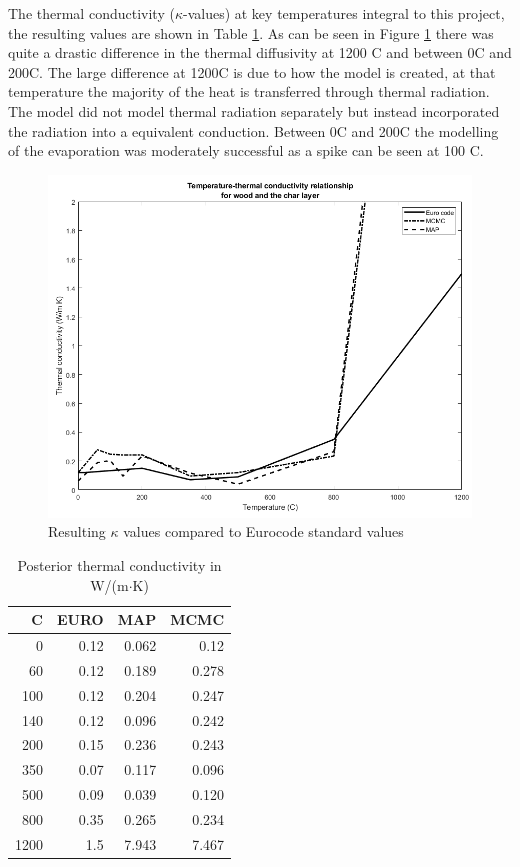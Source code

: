 The thermal conductivity ($\kappa$-values) at key temperatures integral to this project, the resulting values are shown in Table \ref{krestab}. 
As can be seen in Figure \ref{kresult_euro_fig} there was quite a drastic difference in the thermal diffusivity at 1200 \textdegree C and between 0\textdegree C and 200\textdegree C.
The large difference at 1200\textdegree C is due to how the model is created, at that temperature the majority of the heat is transferred through thermal radiation.
The model did not model thermal radiation separately but instead incorporated the radiation into a equivalent conduction.
Between 0\textdegree C and 200\textdegree C the modelling of the evaporation was moderately successful as a spike can be seen at 100 \textdegree C.  
\begin{figure}
\centering	
	\includegraphics[width=\textwidth]{figures/kvalues_all_NOshi.png}
	\caption{Resulting $\kappa$ values compared to Eurocode standard values}
	\label{kresult_euro_fig}
\end{figure}
\begin{table} 
\centering
\caption{Posterior thermal conductivity in W/(m$\cdot$K)}
\label{krestab}
	\begin{tabular}{ r r r r }
	\toprule
	 \textdegree C & EURO & MAP & MCMC\\
	\midrule
	0   & 0.12&0.062 &0.12\\
	60  &0.12& 0.189 &0.278\\
	100 &0.12& 0.204 &0.247\\
 	140 &0.12& 0.096 &0.242\\
	200 & 0.15& 0.236 &0.243\\
	350 & 0.07& 0.117  &0.096\\
	500 & 0.09& 0.039 &0.120\\
	800 & 0.35& 0.265 &0.234\\
	1200& 1.5& 7.943 &7.467\\
	\bottomrule	
	\end{tabular}
	
\end{table}
 
